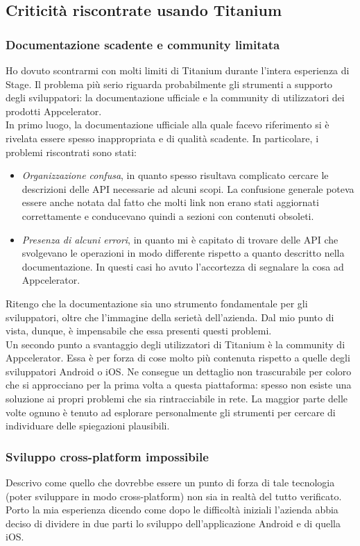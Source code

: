 		\subsection{Criticità riscontrate usando Titanium}
			\subsubsection{Documentazione scadente e community limitata}
				Ho dovuto scontrarmi con molti limiti di Titanium durante l'intera esperienza di Stage. Il problema più serio
				riguarda probabilmente gli strumenti a supporto degli sviluppatori: la documentazione ufficiale e la community di
				utilizzatori dei prodotti Appcelerator.\\
				In primo luogo, la documentazione ufficiale alla quale facevo riferimento si è rivelata essere spesso inappropriata e
				di qualità scadente. In particolare, i problemi riscontrati sono stati:
				\begin{itemize}
					\item \emph{Organizzazione confusa}, in quanto spesso risultava complicato cercare le descrizioni delle API
					necessarie ad alcuni scopi. La confusione generale poteva essere anche notata dal fatto che molti link non
					erano stati aggiornati correttamente e conducevano quindi a sezioni con contenuti obsoleti.
					\item \emph{Presenza di alcuni errori}, in quanto mi è capitato di trovare delle API che svolgevano le
					operazioni in modo differente rispetto a quanto descritto nella documentazione. In questi casi ho avuto
					l'accortezza di segnalare la cosa ad Appcelerator.
				\end{itemize}
				Ritengo che la documentazione sia uno strumento fondamentale per gli sviluppatori, oltre che l'immagine della serietà
				dell'azienda. Dal mio punto di vista, dunque, è impensabile che essa presenti questi problemi.\\
				Un secondo punto a svantaggio degli utilizzatori di Titanium è la community di Appcelerator. Essa è per forza di cose
				molto più contenuta rispetto a quelle degli sviluppatori Android o iOS. Ne consegue un dettaglio non trascurabile per
				coloro che si approcciano per la prima volta a questa piattaforma: spesso non esiste una soluzione ai propri problemi
				che sia rintracciabile in rete. La maggior parte delle volte ognuno è tenuto ad esplorare personalmente gli strumenti
				per cercare di individuare delle spiegazioni plausibili.
			\subsubsection{Sviluppo cross-platform impossibile}
				Descrivo come quello che dovrebbe essere un punto di forza di tale tecnologia (poter sviluppare in modo
				cross-platform) non sia in realtà del tutto verificato. Porto la mia esperienza dicendo come dopo le difficoltà
				iniziali l'azienda abbia deciso di dividere in due parti lo sviluppo dell'applicazione Android e di quella iOS.
